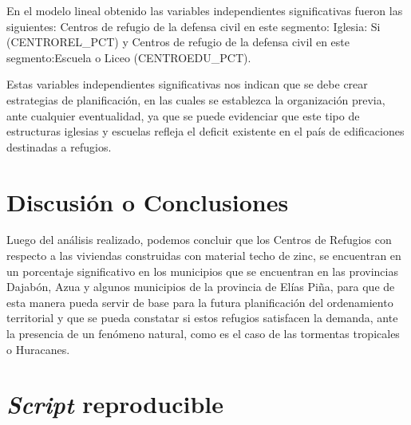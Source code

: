 \documentclass[11pt,]{article}
\begin{document}
En el modelo lineal obtenido las variables independientes significativas
fueron las siguientes: Centros de refugio de la defensa civil en este
segmento: Iglesia: Si (CENTROREL\_PCT) y Centros de refugio de la
defensa civil en este segmento:Escuela o Liceo (CENTROEDU\_PCT).

Estas variables independientes significativas nos indican que se debe
crear estrategias de planificación, en las cuales se establezca la
organización previa, ante cualquier eventualidad, ya que se puede
evidenciar que este tipo de estructuras iglesias y escuelas refleja el
deficit existente en el país de edificaciones destinadas a refugios.

\section{Discusión o Conclusiones}\label{discusiuxf3n-o-conclusiones}

Luego del análisis realizado, podemos concluir que los Centros de
Refugios con respecto a las viviendas construidas con material techo de
zinc, se encuentran en un porcentaje significativo en los municipios que
se encuentran en las provincias Dajabón, Azua y algunos municipios de la
provincia de Elías Piña, para que de esta manera pueda servir de base
para la futura planificación del ordenamiento territorial y que se pueda
constatar si estos refugios satisfacen la demanda, ante la presencia de
un fenómeno natural, como es el caso de las tormentas tropicales o
Huracanes.

\section{\texorpdfstring{\emph{Script}
reproducible}{Script reproducible}}\label{script-reproducible}
\end{document}
